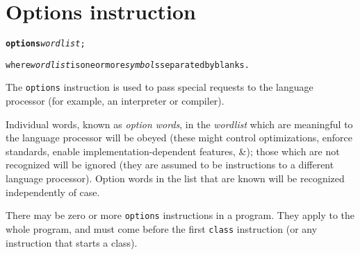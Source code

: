 \chapter{Options instruction}\label{refoptions}
\begin{shaded}
\begin{alltt}
\textbf{options} \emph{wordlist};

where \emph{wordlist} is one or more \emph{symbol}s separated by blanks.
\end{alltt}
\end{shaded}
 
The \texttt{options} instruction is used to pass special requests to
the language processor (for example, an interpreter or compiler).
 
Individual words, known as \emph{option words}, in the
\emph{wordlist} which are meaningful to the language processor will
be obeyed (these might control optimizations, enforce standards, enable
implementation-dependent features, \&); those which are not
recognized will be ignored (they are assumed to be instructions to a
different language processor).
Option words in the list that are known will be recognized independently
of case.
 
There may be zero or more \texttt{options} instructions in a program.
They apply to the whole program, and must come before the first
\texttt{class} instruction (or any instruction that starts a class).
 
